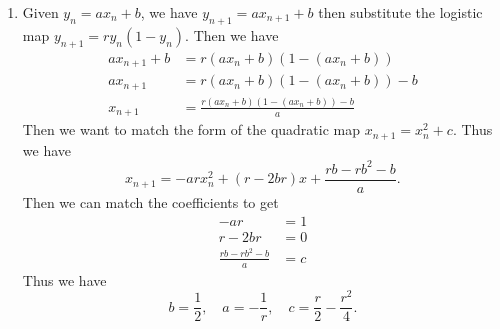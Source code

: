 \documentclass[12pt]{exam}
\begin{document}
\begin{enumerate}
	\item Given $y_n = ax_n + b$, we have $y_{n+1} = ax_{n+1} +b$ then substitute the logistic map $y_{n+1} = ry_n(1-y_n)$. Then we have
		\begin{align*}
			ax_{n+1} + b &= r(ax_n + b)(1-(ax_n+b)) \\
			ax_{n+1} &= r(ax_n + b)(1-(ax_n+b)) - b \\
			x_{n+1} &= \frac{r(ax_n + b)(1-(ax_n+b)) - b}{a} 
		\end{align*}
		Then we want to match the form of the quadratic map $x_{n+1} = x_n^2 + c$. Thus we have
		\[ x_{n+1} = -arx_n^2 + (r-2br)x + \frac{rb-rb^2-b}{a} .\]
		Then we can match the coefficients to get
		\begin{align}
			-ar &= 1 \\
			r-2br &= 0 \\
			\frac{rb-rb^2-b}{a} &= c
		\end{align}
		Thus we have
		\[ b = \frac{1}{2}, \quad a = -\frac{1}{r}, \quad c = \frac{r}{2} - \frac{r^2}{4}.\]
		



\end{enumerate}
\end{document}
